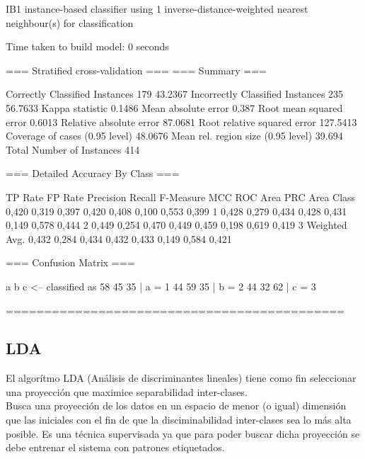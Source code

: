 \documentclass[12pt,a4paper,titlepage]{report}
\begin{document}
IB1 instance-based classifier
using 1 inverse-distance-weighted nearest neighbour(s) for classification


Time taken to build model: 0 seconds

=== Stratified cross-validation ===
=== Summary ===

Correctly Classified Instances         179               43.2367 %
Incorrectly Classified Instances       235               56.7633 %
Kappa statistic                          0.1486
Mean absolute error                      0.387 
Root mean squared error                  0.6013
Relative absolute error                 87.0681 %
Root relative squared error            127.5413 %
Coverage of cases (0.95 level)          48.0676 %
Mean rel. region size (0.95 level)      39.694  %
Total Number of Instances              414     

=== Detailed Accuracy By Class ===

                 TP Rate  FP Rate  Precision  Recall   F-Measure  MCC      ROC Area  PRC Area  Class
                 0,420    0,319    0,397      0,420    0,408      0,100    0,553     0,399     1
                 0,428    0,279    0,434      0,428    0,431      0,149    0,578     0,444     2
                 0,449    0,254    0,470      0,449    0,459      0,198    0,619     0,419     3
Weighted Avg.    0,432    0,284    0,434      0,432    0,433      0,149    0,584     0,421     

=== Confusion Matrix ===

  a  b  c   <-- classified as
 58 45 35 |  a = 1
 44 59 35 |  b = 2
 44 32 62 |  c = 3

  ============================================\\
 	
\subsection{LDA}

El algorítmo LDA (Análisis de discriminantes lineales) tiene como fin seleccionar una proyección que maximice separabilidad inter-clases.\\
Busca una proyección de los datos en un espacio de menor (o igual) dimensión que las iniciales con el fin de que la disciminabilidad inter-clases sea lo más alta posible. Es una técnica supervisada ya que para poder buscar dicha proyección se debe entrenar el sistema con patrones etiquetados.\\
\end{document}
